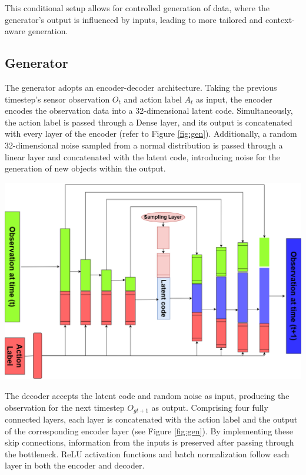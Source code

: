 \documentclass[12pt,twoside,a4paper,parskip]{scrbook} %
\begin{document}
This conditional setup allows for controlled generation of data, where the generator's output is influenced by inputs, leading to more tailored and context-aware generation.

\subsection{Generator}
The generator adopts an encoder-decoder architecture. Taking the previous timestep's sensor observation \(O_t\) and action label \(A_t\) as input, the encoder encodes the observation data into a 32-dimensional latent code. Simultaneously, the action label is passed through a Dense layer, and its output is concatenated with every layer of the encoder (refer to Figure \ref{fig:gen}). Additionally, a random 32-dimensional noise sampled from a normal distribution is passed through a linear layer and concatenated with the latent code, introducing noise for the generation of new objects within the output.

\begin{minipage}[t]{\linewidth}
        \centering
        \includegraphics[width=1\textwidth]{Images/generator.png}
        \label{fig:gen}
        \vspace{-\baselineskip} %
    \end{minipage}
    \hfill
  

The decoder accepts the latent code and random noise as input, producing the observation for the next timestep \(O_{gt+1}\) as output. Comprising four fully connected layers, each layer is concatenated with the action label and the output of the corresponding encoder layer (see Figure \ref{fig:gen}). By implementing these skip connections, information from the inputs is preserved after passing through the bottleneck. ReLU activation functions and batch normalization follow each layer in both the encoder and decoder.
\end{document}
